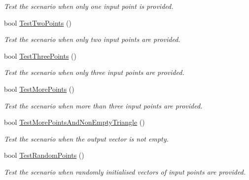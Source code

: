 \begin{DoxyCompactItemize}
\begin{DoxyCompactList}\small\item\em \-Test the scenario when only one input point is provided. \end{DoxyCompactList}\item 
bool \hyperlink{classmultiscaletest_1_1MinEnclosingTriangleFinderTest_a960264fec570c781efa0fb325714f347}{\-Test\-Two\-Points} ()
\begin{DoxyCompactList}\small\item\em \-Test the scenario when only two input points are provided. \end{DoxyCompactList}\item 
bool \hyperlink{classmultiscaletest_1_1MinEnclosingTriangleFinderTest_a2af4a9823e1a12390f71e6d0a2f97dc8}{\-Test\-Three\-Points} ()
\begin{DoxyCompactList}\small\item\em \-Test the scenario when only three input points are provided. \end{DoxyCompactList}\item 
bool \hyperlink{classmultiscaletest_1_1MinEnclosingTriangleFinderTest_a94579bc1f8e370dc5aaf8c9075fae541}{\-Test\-More\-Points} ()
\begin{DoxyCompactList}\small\item\em \-Test the scenario when more than three input points are provided. \end{DoxyCompactList}\item 
bool \hyperlink{classmultiscaletest_1_1MinEnclosingTriangleFinderTest_abc2b3c5f71876cfea21fa4dce51c0ef2}{\-Test\-More\-Points\-And\-Non\-Empty\-Triangle} ()
\begin{DoxyCompactList}\small\item\em \-Test the scenario when the output vector is not empty. \end{DoxyCompactList}\item 
bool \hyperlink{classmultiscaletest_1_1MinEnclosingTriangleFinderTest_aef8954ed38b8ce5709fe7a64d1c44648}{\-Test\-Random\-Points} ()
\begin{DoxyCompactList}\small\item\em \-Test the scenario when randomly initialised vectors of input points are provided. \end{DoxyCompactList}\end{DoxyCompactItemize}
